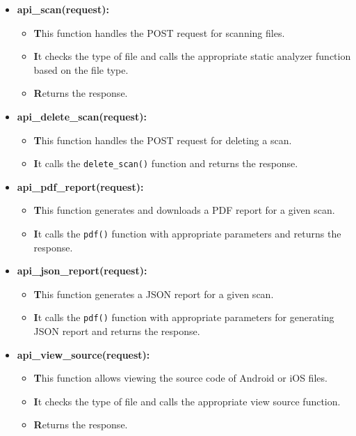 \documentclass{report}
\begin{document}
\begin{itemize}
\begin{itemize}
\begin{itemize}
                  \item \textbf{api\_scan(request):}
                    \begin{itemize}
                      \item \textbf This function handles the POST request for scanning files.
                      \item \textbf It checks the type of file and calls the appropriate static analyzer function based on the file type.
                      \item \textbf Returns the response.
                    \end{itemize}
                  
                  \item \textbf{api\_delete\_scan(request):}
                    \begin{itemize}
                      \item \textbf This function handles the POST request for deleting a scan.
                      \item \textbf It calls the \texttt{delete\_scan()} function and returns the response.
                    \end{itemize}
                  
                  \item \textbf{api\_pdf\_report(request):}
                    \begin{itemize}
                      \item \textbf This function generates and downloads a PDF report for a given scan.
                      \item \textbf It calls the \texttt{pdf()} function with appropriate parameters and returns the response.
                    \end{itemize}
                  
                  \item \textbf{api\_json\_report(request):}
                    \begin{itemize}
                      \item \textbf This function generates a JSON report for a given scan.
                      \item \textbf It calls the \texttt{pdf()} function with appropriate parameters for generating JSON report and returns the response.
                    \end{itemize}
                  
                  \item \textbf{api\_view\_source(request):}
                    \begin{itemize}
                      \item \textbf This function allows viewing the source code of Android or iOS files.
                      \item \textbf It checks the type of file and calls the appropriate view source function.
                      \item \textbf Returns the response.
                    \end{itemize}
                  

\end{itemize}
\end{itemize}
\end{itemize}
\end{document}
